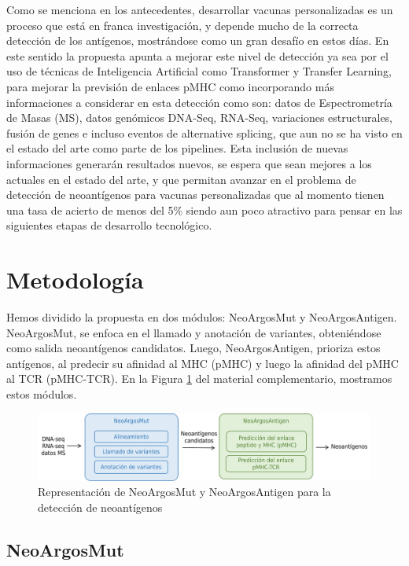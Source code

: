 \documentclass[a4paper,11pt]{article}
\begin{document}
Como se menciona en los antecedentes, desarrollar vacunas personalizadas es un proceso que está en franca investigación, y depende mucho de la correcta detección de los antígenos, mostrándose como un gran desafío en estos días. En este sentido la propuesta apunta a mejorar este nivel de detección ya sea por el uso de técnicas de Inteligencia Artificial como Transformer y Transfer Learning, para mejorar la previsión de enlaces pMHC como incorporando más informaciones a considerar en esta detección como son: datos de Espectrometría de Masas (MS), datos genómicos DNA-Seq, RNA-Seq, variaciones estructurales, fusión de genes e incluso eventos de alternative splicing, que aun no se ha visto en el estado del arte como parte de los pipelines. 
Esta inclusión de nuevas informaciones generarán resultados nuevos, se espera que sean mejores a los actuales en el estado del arte, y que permitan avanzar en el problema de detección de neoantígenos para vacunas personalizadas que al momento tienen una tasa de acierto de menos del 5\% siendo aun poco atractivo para pensar en las siguientes etapas de desarrollo tecnológico.


\section{Metodología} 


Hemos dividido la propuesta en dos módulos: NeoArgosMut y NeoArgosAntigen. NeoArgosMut, se enfoca en el llamado y anotación de variantes, obteniéndose como salida neoantígenos candidatos. Luego, NeoArgosAntigen, prioriza estos antígenos, al predecir su afinidad al MHC (pMHC) y luego la afinidad del pMHC al TCR (pMHC-TCR). En la Figura \ref{fig:pipeline} del material complementario, mostramos estos módulos. 



\begin{figure}[h]	
		\centering
		\includegraphics[width=\textwidth]{../img/pipeline/proposal_pipeline}	
	\caption{Representación de NeoArgosMut y NeoArgosAntigen para la detección de neoantígenos}
	\label{fig:pipeline}
\end{figure}


\subsection{NeoArgosMut}
\end{document}
